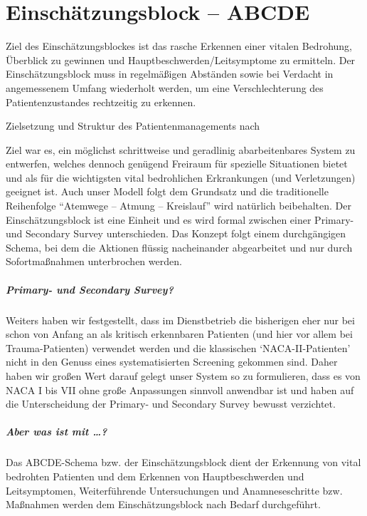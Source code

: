 \clearpage
\section{Einschätzungsblock -- ABCDE}
\label{topic:ersteinschaetzung}
\label{topic:einschaetzungsblock}

Ziel des Einschätzungsblockes ist das rasche Erkennen einer
vitalen Bedrohung, Überblick zu gewinnen und
Hauptbeschwerden/Leitsymptome zu ermitteln. Der
Einschätzungsblock muss in regelmäßigen Abständen sowie bei
Verdacht in angemessenem Umfang wiederholt werden, um eine
Verschlechterung des Patientenzustandes rechtzeitig zu
erkennen. 

{Zielsetzung und Struktur des Patientenmanagements nach \AASS}
{Ziel war es, ein möglichst schrittweise und geradlinig abarbeitenbares
System zu entwerfen, welches dennoch genügend Freiraum für spezielle
Situationen bietet und als  für die wichtigsten vital bedrohlichen
Erkrankungen (und Verletzungen) geeignet ist. 
Auch unser Modell folgt dem Grundsatz  und die traditionelle Reihenfolge
\enquote{Atemwege -- Atmung -- Kreislauf} wird natürlich
beibehalten. 
Der Einschätzungsblock ist eine Einheit und es wird formal
 zwischen einer Primary- und Secondary Survey
unterschieden.
Das Konzept folgt einem durchgängigen Schema, bei dem die
Aktionen flüssig nacheinander abgearbeitet und nur durch
Sofortmaßnahmen unterbrochen werden.

\subparagraph{Primary- und Secondary Survey?}
Weiters haben wir festgestellt, dass im Dienstbetrieb die bisherigen
 eher nur bei schon von Anfang an als kritisch
erkennbaren Patienten (und hier vor allem bei Trauma-Patienten)
verwendet werden und die klassischen \enquote*{NACA-II-Patienten} nicht in den
Genuss eines systematisierten Screening gekommen sind. Daher haben wir
großen Wert darauf gelegt unser System so zu formulieren, dass es von
NACA I bis VII ohne große Anpassungen sinnvoll anwendbar ist
und haben auf die Unterscheidung der Primary- und Secondary
Survey bewusst verzichtet.

\subparagraph{Aber was ist mit {\ldots}?}
Das ABCDE-Schema bzw. der Einschätzungsblock dient der
Erkennung von vital bedrohten Patienten und dem Erkennen von Hauptbeschwerden und
Leitsymptomen,  Weiterführende Untersuchungen
und Anamneseschritte bzw. Maßnahmen werden  dem
Einschätzungsblock nach Bedarf durchgeführt.

}
